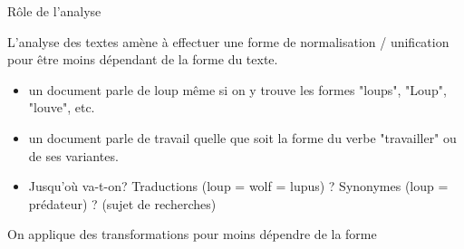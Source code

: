 




\begin{frame}{Rôle de l'analyse}

L'analyse des textes amène à effectuer une forme de 
normalisation / unification pour être moins dépendant de la
forme du texte.

\begin{itemize}
  \item un document parle de loup même si on y trouve les formes
     "loups", "Loup", "louve", etc.
  \item un document parle de travail quelle que soit la forme
     du verbe "travailler" ou de ses variantes.
  \item Jusqu'où va-t-on? Traductions (loup = wolf = lupus) ? Synonymes
      (loup  = prédateur) ? (sujet de recherches)
\end{itemize}

\vfill

\begin{blocgauche}
On applique des \alert{transformations} pour moins dépendre de la forme 
\end{blocgauche}

\end{frame}


